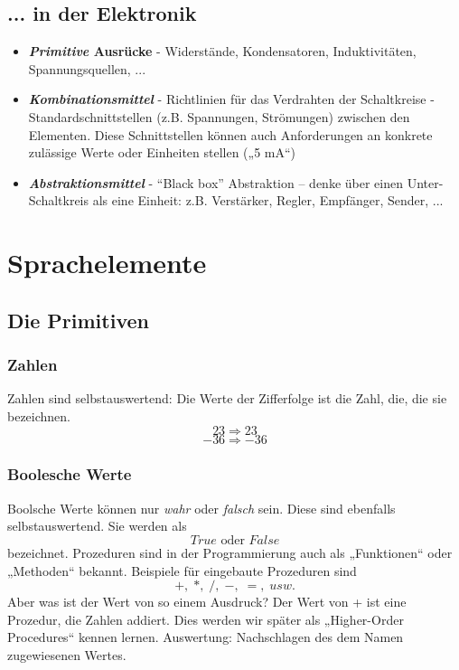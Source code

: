 \subsection{... in der Elektronik}
\begin{itemize}
	\item \textbf{\textit{Primitive} Ausrücke}
		\subitem - Widerstände, Kondensatoren, Induktivitäten, Spannungsquellen, ...

	\item \textbf{\textit{Kombinationsmittel}}
		\subitem - Richtlinien für das Verdrahten der Schaltkreise
		\subitem - Standardschnittstellen (z.B. Spannungen, Strömungen) zwischen den
		Elementen. Diese Schnittstellen können auch Anforderungen an
		konkrete zulässige Werte oder Einheiten stellen („5 mA“)

	\item \textbf{\textit{Abstraktionsmittel}}
		\subitem - 	“Black box” Abstraktion – denke über einen Unter-Schaltkreis als eine
		Einheit: z.B. Verstärker, Regler, Empfänger, Sender, ...
\end{itemize}


\section{Sprachelemente}

\subsection{Die Primitiven}
\subsubsection{Zahlen}
Zahlen sind selbstauswertend: Die Werte der Zifferfolge ist die Zahl,
die, die sie bezeichnen.
$$ 23 \Rightarrow 23 $$
$$ -36 \Rightarrow -36 $$

\subsubsection{Boolesche Werte}
Boolsche Werte können nur \textit{wahr} oder \textit{falsch} sein. Diese sind ebenfalls
selbstauswertend. Sie werden als 
$$ True \text{ oder } False $$ 
bezeichnet. Prozeduren sind in der Programmierung auch als „Funktionen“ oder „Methoden“ bekannt. Beispiele für eingebaute Prozeduren sind
$$ +, \; *, \; /, \; -, \; =, \; usw.$$
Aber was ist der Wert von so einem Ausdruck? Der Wert von + ist eine Prozedur, die Zahlen addiert. Dies werden wir später als „Higher-Order Procedures“ kennen lernen.
Auswertung: Nachschlagen des dem Namen zugewiesenen Wertes.

